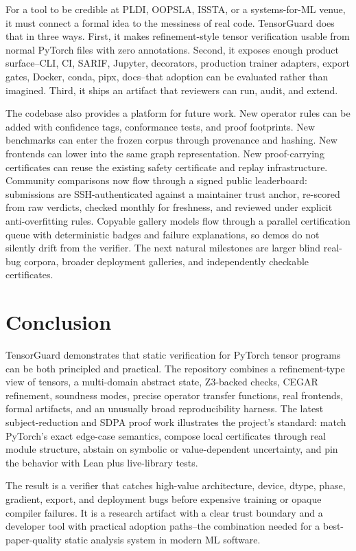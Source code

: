 \documentclass[11pt]{article}
\newcommand{\tg}{TensorGuard}
\begin{document}
For a tool to be credible at PLDI, OOPSLA, ISSTA, or a systems-for-ML venue, it
must connect a formal idea to the messiness of real code.  \tg{} does that in
three ways.  First, it makes refinement-style tensor verification usable from
normal PyTorch files with zero annotations.  Second, it exposes enough product
surface--CLI, CI, SARIF, Jupyter, decorators, production trainer adapters,
export gates, Docker, conda, pipx, docs--that adoption can be evaluated rather than imagined.
Third, it ships an artifact that reviewers can run, audit, and extend.

The codebase also provides a platform for future work.  New operator rules can
be added with confidence tags, conformance tests, and proof footprints.  New
benchmarks can enter the frozen corpus through provenance and hashing.  New
frontends can lower into the same graph representation.  New proof-carrying
certificates can reuse the existing safety certificate and replay infrastructure.
Community comparisons now flow through a signed public leaderboard: submissions
are SSH-authenticated against a maintainer trust anchor, re-scored from raw
verdicts, checked monthly for freshness, and reviewed under explicit
anti-overfitting rules.  Copyable gallery models flow through a parallel
certification queue with deterministic badges and failure explanations, so demos
do not silently drift from the verifier.  The next natural milestones are larger
blind real-bug corpora, broader deployment galleries, and independently
checkable certificates.

\section{Conclusion}

\tg{} demonstrates that static verification for PyTorch tensor programs can be
both principled and practical.  The repository combines a refinement-type view
of tensors, a multi-domain abstract state, Z3-backed checks, CEGAR refinement,
soundness modes, precise operator transfer functions, real frontends, formal
artifacts, and an unusually broad reproducibility harness.  The latest
subject-reduction and SDPA proof work illustrates the project's standard: match
PyTorch's exact edge-case semantics, compose local certificates through real
module structure, abstain on symbolic or value-dependent uncertainty, and pin
the behavior with Lean plus live-library tests.

The result is a verifier that catches high-value architecture, device, dtype,
phase, gradient, export, and deployment bugs before expensive training or
opaque compiler failures.  It is a research artifact with a clear trust
boundary and a developer tool with practical adoption paths--the combination
needed for a best-paper-quality static analysis system in modern ML software.
\end{document}
